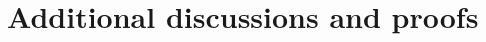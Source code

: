 \documentclass{subfiles}
\begin{document}
\chapter{Additional discussions and proofs}\


\end{document}
